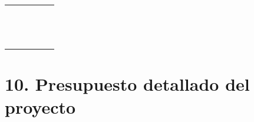 \documentclass[11pt]{charter}
\begin{document}
\begin{table}
\begin{tabularx}{\linewidth}{@{}|c|X|X|X|X|c|@{}}
 &  &  &  &  &  \\ \hline
 &  &  &  &  &  \\ \hline
 &  &  &  &  &  \\ \hline
 &  &  &  &  &  \\ \hline
 &  &  &  &  &  \\ \hline
 &  &  &  &  &  \\ \hline
 &  &  &  &  &  \\ \hline
 &  &  &  &  &  \\ \hline
 &  &  &  &  &  \\ \hline
 &  &  &  &  &  \\ \hline
 &  &  &  &  &  \\ \hline 
 &  &  &  &  &  \\ \hline
 &  &  &  &  &  \\ \hline
 &  &  &  &  &  \\ \hline
 &  &  &  &  &  \\ \hline

\end{tabularx}%
\end{table}


\section{10. Presupuesto detallado del proyecto}
\label{sec:presupuesto}
\end{document}
